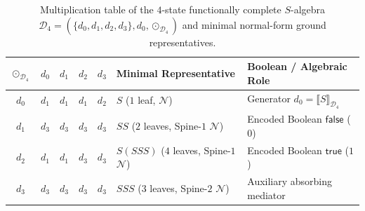 \documentclass[11pt,reqno]{amsart}
\numberwithin{equation}{section}
\theoremstyle{plain}
\theoremstyle{definition}
\theoremstyle{remark}
\begin{document}
\begin{table}[htbp]
\centering
\caption{Multiplication table of the $4$-state functionally complete $S$-algebra $\mathcal{D}_4 = (\{d_0, d_1, d_2, d_3\}, d_0, \odot_{\mathcal{D}_4})$ and minimal normal-form ground representatives.}
\label{tab:d4-algebra}
\small
\begin{tabular}{@{}cccccll@{}}
\toprule
$\odot_{\mathcal{D}_4}$ & $d_0$ & $d_1$ & $d_2$ & $d_3$ & Minimal Representative & Boolean / Algebraic Role \\
\midrule
$d_0$ & $d_1$ & $d_1$ & $d_1$ & $d_2$ & $S$ ($1$ leaf, $\mathcal{N}$) & Generator $d_0 = \llbracket S \rrbracket_{\mathcal{D}_4}$ \\
$d_1$ & $d_3$ & $d_3$ & $d_3$ & $d_3$ & $S S$ ($2$ leaves, Spine-$1$ $\mathcal{N}$) & Encoded Boolean $\mathsf{false}$ ($0$) \\
$d_2$ & $d_1$ & $d_1$ & $d_3$ & $d_3$ & $S(S S S)$ ($4$ leaves, Spine-$1$ $\mathcal{N}$) & Encoded Boolean $\mathsf{true}$ ($1$) \\
$d_3$ & $d_3$ & $d_3$ & $d_3$ & $d_3$ & $S S S$ ($3$ leaves, Spine-$2$ $\mathcal{N}$) & Auxiliary absorbing mediator \\
\bottomrule
\end{tabular}
\end{table}
\end{document}

